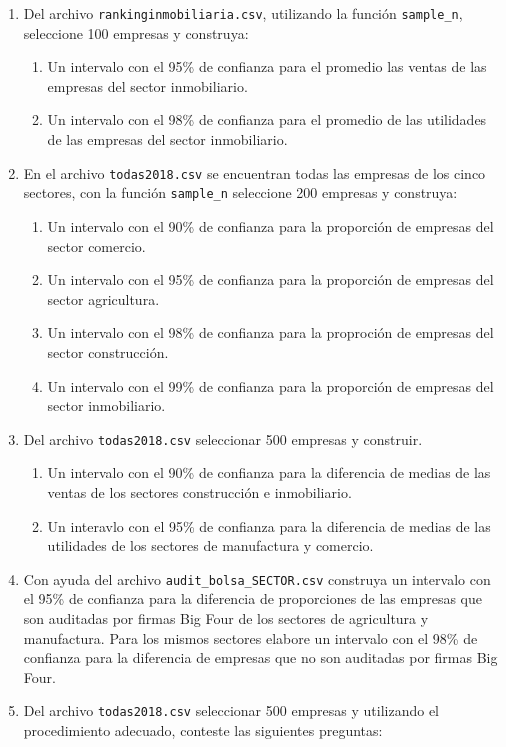 \documentclass[
]{krantz}
\providecommand{\tightlist}{%
  \setlength{\itemsep}{0pt}\setlength{\parskip}{0pt}}
\begin{document}
\begin{enumerate}
\def\labelenumi{\arabic{enumi}.}
\item
  Del archivo \texttt{rankinginmobiliaria.csv}, utilizando la función \texttt{sample\_n}, seleccione 100 empresas y construya:

  \begin{enumerate}
  \def\labelenumii{\alph{enumii}.}
  \tightlist
  \item
    Un intervalo con el 95\% de confianza para el promedio las ventas de las empresas del sector inmobiliario.
  \item
    Un intervalo con el 98\% de confianza para el promedio de las utilidades de las empresas del sector inmobiliario.
  \end{enumerate}
\item
  En el archivo \texttt{todas2018.csv} se encuentran todas las empresas de los cinco sectores, con la función \texttt{sample\_n} seleccione 200 empresas y construya:

  \begin{enumerate}
  \def\labelenumii{\alph{enumii}.}
  \tightlist
  \item
    Un intervalo con el 90\% de confianza para la proporción de empresas del sector comercio.
  \item
    Un intervalo con el 95\% de confianza para la proporción de empresas del sector agricultura.
  \item
    Un intervalo con el 98\% de confianza para la proproción de empresas del sector construcción.
  \item
    Un intervalo con el 99\% de confianza para la proporción de empresas del sector inmobiliario.
  \end{enumerate}
\item
  Del archivo \texttt{todas2018.csv} seleccionar 500 empresas y construir.

  \begin{enumerate}
  \def\labelenumii{\alph{enumii}.}
  \tightlist
  \item
    Un intervalo con el 90\% de confianza para la diferencia de medias de las ventas de los sectores construcción e inmobiliario.
  \item
    Un interavlo con el 95\% de confianza para la diferencia de medias de las utilidades de los sectores de manufactura y comercio.
  \end{enumerate}
\item
  Con ayuda del archivo \texttt{audit\_bolsa\_SECTOR.csv} construya un intervalo con el 95\% de confianza para la diferencia de proporciones de las empresas que son auditadas por firmas Big Four de los sectores de agricultura y manufactura. Para los mismos sectores elabore un intervalo con el 98\% de confianza para la diferencia de empresas que no son auditadas por firmas Big Four.
\item
  Del archivo \texttt{todas2018.csv} seleccionar 500 empresas y utilizando el procedimiento adecuado, conteste las siguientes preguntas:


\end{enumerate}
\end{document}

